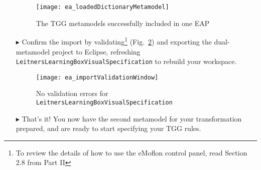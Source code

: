 \begin{itemize}
\begin{figure}[htbp]
\begin{center}
  \texttt{[image: ea\_loadedDictionaryMetamodel]}
  \caption{The TGG metamodels successfully included in one EAP}
  \label{ea:importProBrowser}
\end{center}
\end{figure}

\clearpage

\item[$\blacktriangleright$] Confirm the import by validating\footnote{To review the details of how to use the eMoflon control panel, read Section 2.8 from
Part II} (Fig.~\ref{ea:importValidationWindow}) and exporting the dual-metamodel project to Eclipse, refreshing \texttt{LeitnersLearningBoxVisualSpecification} to rebuild your workspace. 

\vspace{0.5cm}

\begin{figure}[htbp]
\begin{center}
  \texttt{[image: ea\_importValidationWindow]}
  \caption{No validation errors for \texttt{LeitnersLearningBoxVisualSpecification}}
  \label{ea:importValidationWindow}
\end{center}
\end{figure}

\vspace{0.5cm}

\item[$\blacktriangleright$] That's it! You now have the second metamodel for your transformation prepared, and are ready to start specifying your TGG rules.


\end{itemize}
